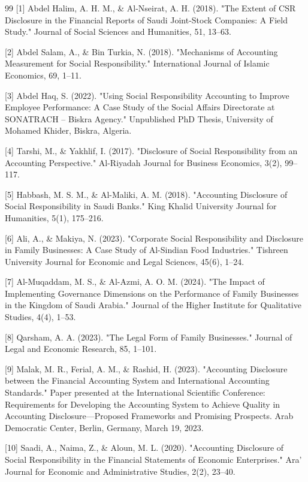 \documentclass[10pt]{NSP1}
\begin{document}
\begin{thebibliography}{99}
[1] Abdel Halim, A. H. M., \& Al-Nseirat, A. H. (2018). "The Extent of CSR Disclosure in the Financial Reports of Saudi Joint-Stock Companies: A Field Study." Journal of Social Sciences and Humanities, 51, 13–63.

[2] Abdel Salam, A., \& Bin Turkia, N. (2018). "Mechanisms of Accounting Measurement for Social Responsibility." International Journal of Islamic Economics, 69, 1–11.

[3] Abdel Haq, S. (2022). "Using Social Responsibility Accounting to Improve Employee Performance: A Case Study of the Social Affairs Directorate at SONATRACH – Biskra Agency." Unpublished PhD Thesis, University of Mohamed Khider, Biskra, Algeria.

[4] Tarshi, M., \& Yakhlif, I. (2017). "Disclosure of Social Responsibility from an Accounting Perspective." Al-Riyadah Journal for Business Economics, 3(2), 99–117.

[5] Habbash, M. S. M., \& Al-Maliki, A. M. (2018). "Accounting Disclosure of Social Responsibility in Saudi Banks." King Khalid University Journal for Humanities, 5(1), 175–216.

[6] Ali, A., \& Makiya, N. (2023). "Corporate Social Responsibility and Disclosure in Family Businesses: A Case Study of Al-Sindian Food Industries." Tishreen University Journal for Economic and Legal Sciences, 45(6), 1–24.

[7] Al-Muqaddam, M. S., \& Al-Azmi, A. O. M. (2024). "The Impact of Implementing Governance Dimensions on the Performance of Family Businesses in the Kingdom of Saudi Arabia." Journal of the Higher Institute for Qualitative Studies, 4(4), 1–53.

[8] Qarsham, A. A. (2023). "The Legal Form of Family Businesses." Journal of Legal and Economic Research, 85, 1–101.

[9] Malak, M. R., Ferial, A. M., \& Rashid, H. (2023). "Accounting Disclosure between the Financial Accounting System and International Accounting Standards." Paper presented at the International Scientific Conference: Requirements for Developing the Accounting System to Achieve Quality in Accounting Disclosure—Proposed Frameworks and Promising Prospects. Arab Democratic Center, Berlin, Germany, March 19, 2023.

[10] Saadi, A., Naima, Z., \& Aloun, M. L. (2020). "Accounting Disclosure of Social Responsibility in the Financial Statements of Economic Enterprises." Ara’ Journal for Economic and Administrative Studies, 2(2), 23–40.


\end{thebibliography}
\end{document}
